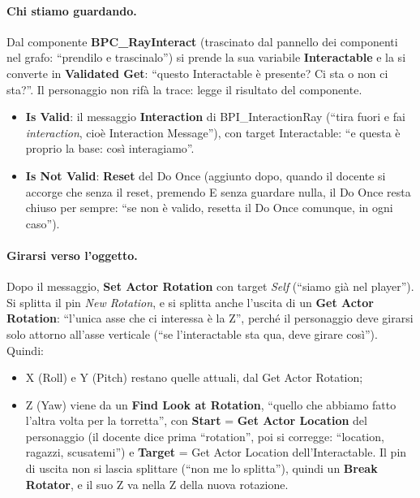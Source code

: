 \paragraph{Chi stiamo guardando.} Dal componente \textbf{BPC\_RayInteract} (trascinato dal
pannello dei componenti nel grafo: ``prendilo e trascinalo'') si prende la sua variabile
\textbf{Interactable} e la si converte in \textbf{Validated Get}: ``questo Interactable è
presente? Ci sta o non ci sta?''. Il personaggio non rifà la trace: legge il risultato del
componente.
\begin{itemize}
  \item \textbf{Is Valid}: il messaggio \textbf{Interaction} di BPI\_InteractionRay
        (``tira fuori e fai \emph{interaction}, cioè Interaction Message''), con target
        Interactable: ``e questa è proprio la base: così interagiamo''.
  \item \textbf{Is Not Valid}: \textbf{Reset} del Do Once (aggiunto dopo, quando il docente
        si accorge che senza il reset, premendo E senza guardare nulla, il Do Once resta
        chiuso per sempre: ``se non è valido, resetta il Do Once comunque, in ogni caso'').
\end{itemize}

\paragraph{Girarsi verso l'oggetto.} Dopo il messaggio, \textbf{Set Actor Rotation} con
target \emph{Self} (``siamo già nel player''). Si splitta il pin \emph{New Rotation}, e si
splitta anche l'uscita di un \textbf{Get Actor Rotation}: ``l'unica asse che ci interessa è
la Z'', perché il personaggio deve girarsi solo attorno all'asse verticale (``se
l'interactable sta qua, deve girare così''). Quindi:
\begin{itemize}
  \item X (Roll) e Y (Pitch) restano quelle attuali, dal Get Actor Rotation;
  \item Z (Yaw) viene da un \textbf{Find Look at Rotation}, ``quello che abbiamo fatto
        l'altra volta per la torretta'', con \textbf{Start} = \textbf{Get Actor Location}
        del personaggio (il docente dice prima ``rotation'', poi si corregge: ``location,
        ragazzi, scusatemi'') e \textbf{Target} = Get Actor Location dell'Interactable. Il
        pin di uscita non si lascia splittare (``non me lo splitta''), quindi un
        \textbf{Break Rotator}, e il suo Z va nella Z della nuova rotazione.
\end{itemize}

